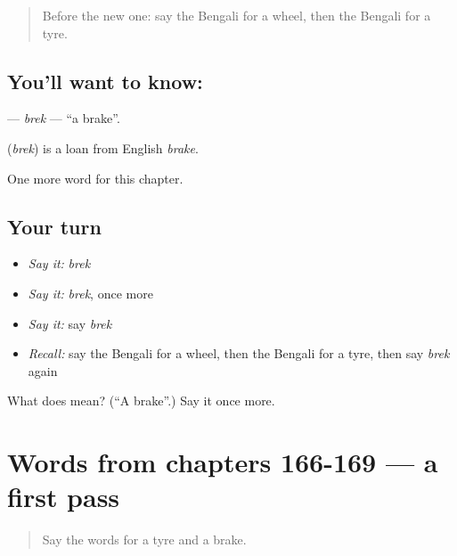 \label{lesson:BN-C174-brek}



\begin{quote}
Before the new one: say the Bengali for a wheel, then the Bengali for a tyre.
\end{quote}

\subsection*{You'll want to know: }
\textbf{} — \emph{brek} — \textquotedblleft{}a brake\textquotedblright{}.

\begin{cousinweb}
\textbf{} (\emph{brek}) is a loan from English \emph{brake}.
\end{cousinweb}

\begin{grammarlens}[title={What you've built}]
One more word for this chapter.
\end{grammarlens}

\subsection*{Your turn}
\begin{itemize}
\raggedright
  \item \emph{Say it:} \emph{brek}
  \item \emph{Say it:} \emph{brek}, once more
  \item \emph{Say it:} say \emph{brek}
  \item \emph{Recall:} say the Bengali for a wheel, then the Bengali for a tyre, then say \emph{brek} again
\end{itemize}

\begin{tcolorbox}[breakable,colback=teal!4,colframe=teal!35!black,title={Before you move on}]
What does  mean? (\textquotedblleft{}A brake\textquotedblright{}.) Say it once more.
\end{tcolorbox}
\section[(dialogue)]{Words from chapters 166-169 — a first pass}

\label{lesson:BN-R174-first-pass-words-from-chapters-166-169}



\begin{quote}
Say the words for a tyre and a brake.
\end{quote}

